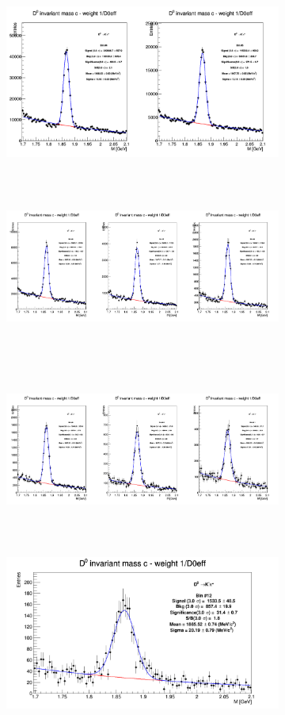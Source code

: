 \begin{enumerate}
\begin{figure}
\begin{enumerate}
\begin{figure}[!htp]
\centering

{\includegraphics[width=1\linewidth, height=6cm]{figures/Dzero/InvMassDistributions_Dzero_Bins4to5.png}}
{\includegraphics[width=1\linewidth, height=6cm]{figures/Dzero/InvMassDistributions_Dzero_Bins6to8.png}}
{\includegraphics[width=1\linewidth, height=6cm]{figures/Dzero/InvMassDistributions_Dzero_Bins9to11.png}}
{\includegraphics[width=0.8\linewidth, height=6cm]{figures/Dzero/InvMassDistributions_Dzero_Bins12to12.png}}


\end{figure}
\end{enumerate}
\end{figure}
\end{enumerate}
